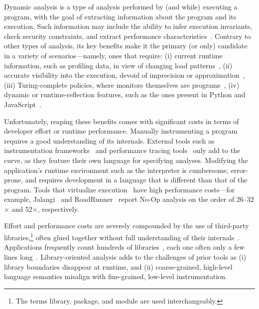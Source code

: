 \documentclass[letterpaper,twocolumn,10pt]{article}
\begin{document}
Dynamic analysis is a type of analysis performed by (and while) executing a program, with the goal of extracting information about the program and its execution.
Such information may include the ability to infer execution invariants, check security constraints, and extract performance characteristics~\cite{analysis:10}.
Contrary to other types of analysis, its key benefits make it the primary (or only) candidate in a variety of scenarios---namely, ones that require:
  (i) current runtime information, such as profiling data, in view of changing load patterns~\cite{staticdynamic},
  (ii) accurate visibility into the execution, devoid of imprecision or approximation~\cite{staticdynamic},
  (iii) Turing-complete policies, where monitors themselves are programs~\cite{contracts1, contracts2, contracts3},
  (iv) dynamic or runtime-reflection features, such as the ones present in Python and JavaScript~\cite{jsanalysis1, jsanalysis2}.

Unfortunately, reaping these benefits comes with significant costs in terms of developer effort or runtime performance.
Manually instrumenting a program requires a good understanding of its internals. 
External tools such as instrumentation frameworks~\cite{pin, valgrind} and performance tracing tools~\cite{perf, dtrace} only add to the curve, as they feature their own language for specifying analyses. 
Modifying the application's runtime environment such as the interpreter is cumbersome, error-prone, and requires development in a language that is different than that of the program.
Tools that virtualize execution~\cite{pin, valgrind, jalangi, roadrunner} have high performance costs---for example, Jalangi~\cite{jalangi} and RoadRunner~\cite{roadrunner} report No-Op analysis on the order of 26--32$\times$ and 52$\times$, respectively.

Effort and performance costs are severely compounded by the use of third-party libraries,\footnote{
  The terms library, package, and module are used interchangeably.
}
often glued together without full understanding of their internals~\cite{libs}.
Applications frequently count hundreds of libraries~\cite{npmstudy:19}, each one often only a few lines long~\cite{leftpad, npmstudy:19}. %
Library-oriented analysis adds to the challenges of prior tools as
  (i) library boundaries disappear at runtime, and
  (ii) coarse-grained, high-level language semantics misalign with fine-grained, low-level instrumentation.
\end{document}
